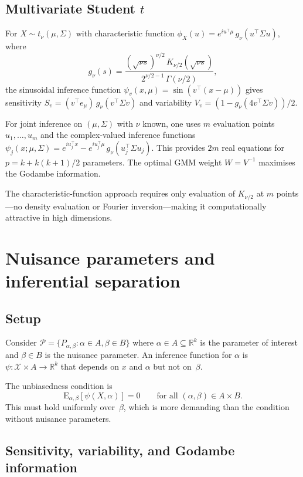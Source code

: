 \documentclass[11pt,a4paper]{article}
\newcommand{\E}{\mathrm{E}}
\newcommand{\R}{\mathbb{R}}
\begin{document}
\subsection{Multivariate Student $t$}\label{subsec:mult-t}

For $X \sim t_\nu(\mu, \Sigma)$ with characteristic function
$\phi_X(u) = e^{iu^\top\mu}\,g_\nu(u^\top\Sigma u)$,
where
\[
g_\nu(s)
= \frac{(\sqrt{\nu s})^{\nu/2}\,K_{\nu/2}(\sqrt{\nu s})}
       {2^{\nu/2-1}\,\Gamma(\nu/2)},
\]
the sinusoidal inference function $\psi_v(x, \mu) = \sin(v^\top(x-\mu))$
gives sensitivity $S_v = (v^\top e_\mu)\,g_\nu(v^\top\Sigma v)$ and
variability $V_v = (1 - g_\nu(4v^\top\Sigma v))/2$.

For joint inference on $(\mu, \Sigma)$ with $\nu$ known, one uses $m$
evaluation points $u_1, \ldots, u_m$ and the complex-valued inference
functions
$\psi_j(x; \mu, \Sigma) = e^{iu_j^\top x} - e^{iu_j^\top\mu}\,g_\nu(u_j^\top\Sigma u_j)$.
This provides $2m$ real equations for $p = k + k(k+1)/2$ parameters.
The optimal GMM weight $W = V^{-1}$ maximises the Godambe information.

The characteristic-function approach requires only evaluation of $K_{\nu/2}$
at $m$ points---no density evaluation or Fourier inversion---making it
computationally attractive in high dimensions.


\section{Nuisance parameters and inferential separation}\label{sec:nuisance}

\subsection{Setup}\label{subsec:nuisance-setup}

Consider $\mathcal P = \{P_{\alpha,\beta} : \alpha \in A, \beta \in B\}$
where $\alpha \in A \subseteq \R^k$ is the parameter of interest and
$\beta \in B$ is the nuisance parameter.  An inference function for
$\alpha$ is $\psi : \mathcal X \times A \to \R^k$ that depends on $x$ and
$\alpha$ but not on~$\beta$.

The unbiasedness condition is
\[
\E_{\alpha,\beta}[\psi(X, \alpha)] = 0
\qquad \text{for all } (\alpha, \beta) \in A \times B.
\]
This must hold uniformly over~$\beta$, which is more demanding than the
condition without nuisance parameters.

\subsection{Sensitivity, variability, and Godambe information}
\end{document}
